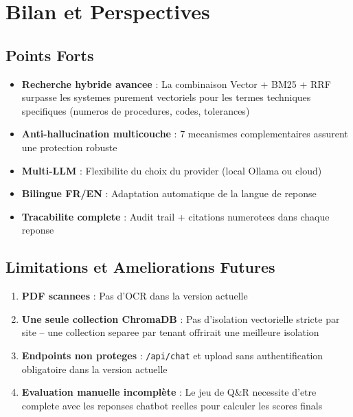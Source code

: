 \documentclass[12pt,a4paper]{article}
\begin{document}
\section{Bilan et Perspectives}

\subsection{Points Forts}

\begin{itemize}
  \item \textbf{Recherche hybride avancee} : La combinaison Vector + BM25 + RRF
        surpasse les systemes purement vectoriels pour les termes techniques
        specifiques (numeros de procedures, codes, tolerances)
  \item \textbf{Anti-hallucination multicouche} : 7 mecanismes complementaires
        assurent une protection robuste
  \item \textbf{Multi-LLM} : Flexibilite du choix du provider (local Ollama ou cloud)
  \item \textbf{Bilingue FR/EN} : Adaptation automatique de la langue de reponse
  \item \textbf{Tracabilite complete} : Audit trail + citations numerotees dans
        chaque reponse
\end{itemize}

\subsection{Limitations et Ameliorations Futures}

\begin{warningbox}
\begin{enumerate}
  \item \textbf{PDF scannees} : Pas d'OCR dans la version actuelle
  \item \textbf{Une seule collection ChromaDB} : Pas d'isolation vectorielle stricte
        par site -- une collection separee par tenant offrirait une meilleure isolation
  \item \textbf{Endpoints non proteges} : \texttt{/api/chat} et upload sans
        authentification obligatoire dans la version actuelle
  \item \textbf{Evaluation manuelle incomplète} : Le jeu de Q\&R necessite d'etre
        complete avec les reponses chatbot reelles pour calculer les scores finals
\end{enumerate}
\end{warningbox}
\end{document}
